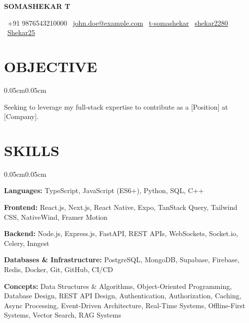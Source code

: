 \documentclass[10pt, letterpaper]{article}
\newenvironment{onecolentry}{
\begin{adjustwidth}{0.05cm}{0.05cm}
}{
\end{adjustwidth}
}
\newenvironment{header}{
\centering\linespread{1.02}
}{
\par
}
\let\hrefWithoutArrow\href
\renewcommand{\href}[2]{\hrefWithoutArrow{#1}{#2}}
\begin{document}

\begin{header}
{\fontsize{22pt}{22pt}\selectfont \textbf{SOMASHEKAR T}}

\vspace{0.1cm}

\normalsize
\faPhone\ +91 9876543210000 \quad
\faEnvelope\ \href{mailto:john.doe@example.com}{john.doe@example.com} \quad
\faLinkedin\ \href{https://linkedin.com/in/t-somashekar}{t-somashekar} \quad
\faGithub\ \href{https://github.com/shekar2280}{shekar2280} \quad
\faCode\ \href{https://leetcode.com/u/Shekar25}{Shekar25}
\end{header}


\section{OBJECTIVE}

\begin{onecolentry}
Seeking to leverage my full-stack expertise to contribute as a [Position] at [Company].
\end{onecolentry}


\section{SKILLS}

\begin{onecolentry}

\small

\textbf{Languages:}
TypeScript, JavaScript (ES6+), Python, SQL, C++

\vspace{0.03cm}

\textbf{Frontend:}
React.js, Next.js, React Native, Expo, TanStack Query, Tailwind CSS, NativeWind, Framer Motion

\vspace{0.03cm}

\textbf{Backend:}
Node.js, Express.js, FastAPI, REST APIs, WebSockets, Socket.io, Celery, Inngest

\vspace{0.03cm}

\textbf{Databases \& Infrastructure:}
PostgreSQL, MongoDB, Supabase, Firebase, Redis, Docker, Git, GitHub, CI/CD

\vspace{0.03cm}

\textbf{Concepts:}
Data Structures \& Algorithms, Object-Oriented Programming, Database Design, REST API Design, Authentication, Authorization, Caching, Async Processing, Event-Driven Architecture, Real-Time Systems, Offline-First Systems, Vector Search, RAG Systems

\end{onecolentry}
\end{document}
